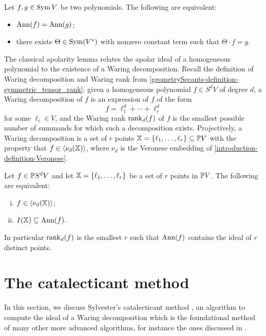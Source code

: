 \begin{proposition}
\label{apolarity-proposition-sameApolar}
 Let $f,g \in \operatorname{Sym} V$ be two polynomials. The following are equivalent:
 \begin{itemize}
  \item $\operatorname{Ann}(f) = \operatorname{Ann}(g)$;
  \item there exists $\Theta \in \operatorname{Sym}(V^*)$ with nonzero constant term such that $\Theta \cdot f = g$. 
 \end{itemize}
\end{proposition}

The classical apolarity lemma relates the apolar ideal of a homogeneous polynomial to the existence of a Waring decomposition. Recall the definition of Waring decomposition and Waring rank from \ref{geometrySecants-definition-symmetric_tensor_rank}: given a homogeneous polynomial $f \in S^d V$ of degree $d$, a Waring decomposition of $f$ is an expression of $f$ of the form 
\[
f = \ell_1^d + \cdots + \ell_r^d
\]
for some $\ell_i \in V$, and the Waring rank $\mathrm{rank}_d(f)$ of $f$ is the smallest possible number of summands for which such a decomposition exists. Projectively, a Waring decomposition is a set of $r$ points $\mathbb{X} = \{ \ell_1 , \ldots , \ell_r \} \subseteq \mathbb{P} V$ with the property that $f \in \langle \nu_d(\mathbb{X}) \rangle$, where $\nu_d$ is the Veronese embedding of \ref{introduction-definition-Veronese}. 

\begin{lemma}
 \label{tensorRank-lemma-apolarityLemma}
 Let $f \in \mathbb{P} S^d V$ and let $\mathbb{X} = \{ \ell_1 , \ldots , \ell_r\}$ be a set of $r$ points in $\mathbb{P} V$. The following are equivalent:
 \begin{enumerate}[(i)]
  \item $f \in \langle \nu_d(\mathbb{X}) \rangle$;
  \item $I(\mathbb{X}) \subseteq \operatorname{Ann}(f)$.
 \end{enumerate}
 In particular $\mathrm{rank}_d(f)$ is the smallest $r$ such that $\operatorname{Ann}(f)$ contains the ideal of $r$ distinct points.
\end{lemma}



\section{The catalecticant method}
\label{tensorRank-section-catalecticant}
In this section, we discuss Sylvester's catalecticant method \cite{Syl52,IK99}, an algorithm to compute the ideal of a Waring decomposition which is the foundational method of many other more advanced algorithms, for instance the ones discussed in \cite{BCMT10,BBCM13,BT20,LMR23}.

